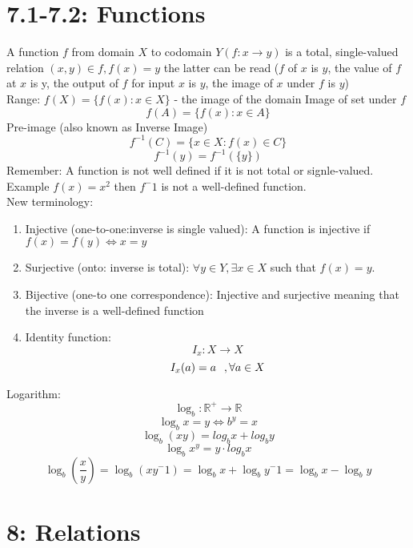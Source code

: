 \documentclass[12pt,letterpaper, onecolumn]{exam}
\begin{document}
	\section{7.1-7.2: Functions}
	A function $f$ from domain $X$ to codomain $Y (f:x \rightarrow y)$ is a total, single-valued relation $(x,y)\in f, f(x)=y$ the latter can be read ($f$ of $x$ is $y$, the value of $f$ at $x$ is y, the output of $f$ for input $x$ is $y$, the image of $x$ under $f$ is $y$)\\
	Range: $f(X)=\{f(x):x\in X\}$ - the image of the domain 
	Image of set under $f$\\
	$$f(A)=\{f(x):x\in A\}$$
	Pre-image (also known as Inverse Image)
	$$f^{-1}(C)=\{x\in X:f(x)\in C\}$$
	$$f^{-1}(y)=f^{-1}(\{y\})$$
	Remember: A function is not well defined if it is not total or signle-valued. Example $f(x)=x^2$ then $f^-1$ is not a well-defined function.\\
	New terminology:
	\begin{enumerate}
		\item Injective (one-to-one:inverse is single valued): A function is injective if $f(x)=f(y)\Leftrightarrow x=y$
		\item Surjective (onto: inverse is total): $\forall y\in Y, \exists x \in X$ such that $f(x)=y$.
		\item Bijective (one-to one correspondence): Injective and surjective meaning that the inverse is a well-defined function
		\item Identity function: $$I_x:X\rightarrow X$$ $$I_x(a)=a\hspace*{0.25cm},\forall a\in X$$
	\end{enumerate}
	Logarithm:\\
	$$\log_b:\mathbb{R^+}\rightarrow \mathbb{R}$$
	$$\log_b x=y \Leftrightarrow b^y=x$$
	$$\log_b (xy)=log_b x+log_b y$$
	$$\log_b x^y=y\cdot log_b x$$
	$$\log_b \left(\frac{x}{y}\right)=\log_b(xy^-1)=\log_b x+\log_b y^-1=\log_b x-\log_b y$$
	$$$$
	\section{8: Relations }
\end{document}
